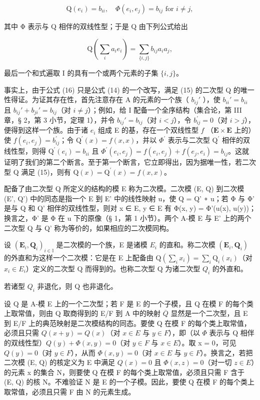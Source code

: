 \[
\mathrm{Q} (e _ {i}) = b _ {i i}, \quad \Phi (e _ {i}, e _ {j}) = b _ {i j} \text {   for   } i \neq j,\tag{15}
\]

其中 Φ 表示与 Q 相伴的双线性型；于是 Q 由下列公式给出

\[
\mathrm{Q} (\sum_ {i} a _ {i} e _ {i}) = \sum_ {\{i, j \}} b _ {i j} a _ {i} a _ {j},\tag{16}
\]

最后一个和式遍取 I 的具有一个或两个元素的子集 \(\{i, j\}\)。

事实上，由于公式 (16) 只是公式 (14) 的一个改写，满足 (15) 的二次型 Q 的唯一性得证。为证其存在性，首先注意存在 A 的元素的一个族（ \(b_{ij}'\) ），使 \(b_{ii}' = b_{ii}\) 且 \(b_{ij}' + b_{ji}' = b_{ij}\)（对 \(i \neq j\)）；例如，给 I 配备一个全序结构（集合论，第 III 章，§ 2，第 3 小节，定理 1），并令 \(b_{ij}' = b_{ij}\)（对 \(i<j\)），令 \(b_{ij}^{\prime}=0\)（对 \(i>j\)），便得到这样一个族。由于诸 \(e_{i}\) 组成 E 的基，存在一个双线性型 \(f\) （\(\mathbf{E}\times\mathbf{E}\) 上的）使 \(f(e_{i},e_{j})=b_{ij}^{\prime}\)；令 \(\mathrm{Q}^{\prime}(x)=f(x,x)\)，并以 \(\Phi^{\prime}\) 表示与二次型 \(\mathrm{Q}^{\prime}\) 相伴的双线性型，则得 \(\mathrm{Q}^{\prime}(e_{i})=b_{ii}\) 且 \(\Phi^{\prime}(e_{i},e_{j})=f(e_{i},e_{j})+f(e_{j},e_{i})=b_{ij}\)。这就证明了我们的第二个断言。至于第一个断言，它立即得出，因为据唯一性，若二次型 Q 满足 (15)，则有 \(\mathrm{Q}(x)=\mathrm{Q}^{\prime}(x)=f(x,x)\)。

配备了由二次型 Q 所定义的结构的模 E 称为二次模。二次模 (E, Q) 到二次模 (E', Q') 中的同态是指一个 E 到 E' 中的线性映射 u，使 Q = Q' ∘ u；若 Φ 与 Φ' 是与 Q 和 Q' 相伴的双线性型，则对 x ∈ E, y ∈ E 有 Φ(x, y) = Φ'(u(x), u(y))；换言之，Φ' 是 Φ 在 u 下的原像（§ 1，第 1 小节）。两个 A-模 E 与 E' 上的两个二次型 Q 与 Q' 称为等价的，如果相应的二次模同构。

设 \((\mathbf{E}_{i}, \mathbf{Q}_{i})_{i\in\mathbb{I}}\) 是二次模的一个族，E 是诸模 \(E_{i}\) 的直和。称二次模 \((\mathbf{E}_{i}, \mathbf{Q}_{i})\) 的外直和为这样一个二次模：它是在 E 上配备由 \(\mathrm{Q}(\sum_{i}x_{i}) = \sum_{i}\mathrm{Q}_{i}(x_{i})\)（对 \(x_{i} \in E_{i}\)）定义的二次型 Q 而得到的。也称二次型 Q 为诸二次型 \(Q_{i}\) 的外直和。

若诸型 \(Q_{i}\) 非退化，则 Q 也非退化。

设 Q 是 A-模 E 上的一个二次型；若 F 是 E 的一个子模，且 Q 在模 F 的每个类上取常值，则由 Q 取商得到的 E/F 到 A 中的映射 \(\overline{Q}\) 显然是一个二次型，且 E 到 E/F 上的典范映射是二次模结构的同态。要使 Q 在模 F 的每个类上取常值，必须且只需 \(Q(x + y) = Q(x)\)（对 \(x \in E\) 与 \(y \in F\)），即（以 \(\Phi\) 表示与 Q 相伴的双线性型）\(Q(y) + \Phi(x, y) = 0\)（对 \(y \in F\) 与 \(x \in E\)）。取 x = 0，可见 \(Q(y) = 0\)（对 \(y \in F\)），从而 \(\Phi(x,y)=0\)（对 \(x\in E\) 与 \(y\in F\)）。换言之，若把二次模 (E, Q) 的核定义为 E 中满足 \(Q(x)=0\) 且 \(\Phi(x,z)=0\)（对一切 \(z\in E\)）的元素 x 的集合 N，则要使 Q 在模 F 的每个类上取常值，必须且只需 F 含于 (E, Q) 的核 N。不难验证 N 是 E 的一个子模。因此，要使 Q 在模 F 的每个类上取常值，必须且只需 F 由 N 的元素生成。

